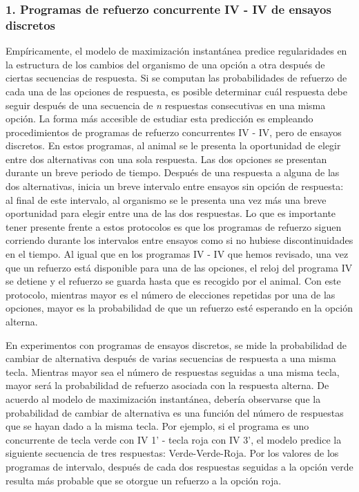 \documentclass[
  letterpaper,
]{book}
\begin{document}
\subsubsection{1. Programas de refuerzo concurrente IV - IV de ensayos
discretos}\label{programas-de-refuerzo-concurrente-iv---iv-de-ensayos-discretos}

Empíricamente, el modelo de maximización instantánea predice
regularidades en la estructura de los cambios del organismo de una
opción a otra después de ciertas secuencias de respuesta. Si se computan
las probabilidades de refuerzo de cada una de las opciones de respuesta,
es posible determinar cuál respuesta debe seguir después de una
secuencia de \emph{n} respuestas consecutivas en una misma opción. La
forma más accesible de estudiar esta predicción es empleando
procedimientos de programas de refuerzo concurrentes IV - IV, pero de
ensayos discretos. En estos programas, al animal se le presenta la
oportunidad de elegir entre dos alternativas con una sola respuesta. Las
dos opciones se presentan durante un breve periodo de tiempo. Después de
una respuesta a alguna de las dos alternativas, inicia un breve
intervalo entre ensayos sin opción de respuesta: al final de este
intervalo, al organismo se le presenta una vez más una breve oportunidad
para elegir entre una de las dos respuestas. Lo que es importante tener
presente frente a estos protocolos es que los programas de refuerzo
siguen corriendo durante los intervalos entre ensayos como si no hubiese
discontinuidades en el tiempo. Al igual que en los programas IV - IV que
hemos revisado, una vez que un refuerzo está disponible para una de las
opciones, el reloj del programa IV se detiene y el refuerzo se guarda
hasta que es recogido por el animal. Con este protocolo, mientras mayor
es el número de elecciones repetidas por una de las opciones, mayor es
la probabilidad de que un refuerzo esté esperando en la opción alterna.

En experimentos con programas de ensayos discretos, se mide la
probabilidad de cambiar de alternativa después de varias secuencias de
respuesta a una misma tecla. Mientras mayor sea el número de respuestas
seguidas a una misma tecla, mayor será la probabilidad de refuerzo
asociada con la respuesta alterna. De acuerdo al modelo de maximización
instantánea, debería observarse que la probabilidad de cambiar de
alternativa es una función del número de respuestas que se hayan dado a
la misma tecla. Por ejemplo, si el programa es uno concurrente de tecla
verde con IV 1' - tecla roja con IV 3', el modelo predice la siguiente
secuencia de tres respuestas: Verde-Verde-Roja. Por los valores de los
programas de intervalo, después de cada dos respuestas seguidas a la
opción verde resulta más probable que se otorgue un refuerzo a la opción
roja.
\end{document}

